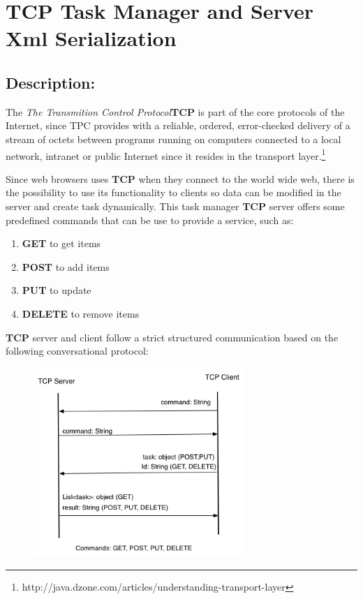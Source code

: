 
\section*{TCP Task Manager and Server Xml Serialization}

\subsection*{Description:}

The \textit{The Transmition Control Protocol}\textbf{TCP} is part of the core protocols of the Internet, since TPC provides with a reliable, ordered, error-checked delivery of a stream of octets between programs running on computers connected to a local network, intranet or public Internet since it resides in the transport layer.\footnote{http://java.dzone.com/articles/understanding-transport-layer}

Since web browsers uses \textbf{TCP} when they connect to the world wide web, there is the possibility to use its functionality to clients so data can be modified in the server and create task dynamically. This task manager \textbf{TCP} server offers some predefined commands that can be use to provide a service, such as:

\begin{enumerate}
\item \textbf{GET} to get items
\item \textbf{POST} to add items
\item \textbf{PUT} to update
\item \textbf{DELETE} to remove items
\end{enumerate}

\textbf{TCP} server and client follow a strict structured communication based on the following conversational protocol:

\begin{figure}[ht!]
\centering
\includegraphics[width=80mm]{graphics/TCP-Server-protocol.png}
\label{overflow}
\end{figure}

